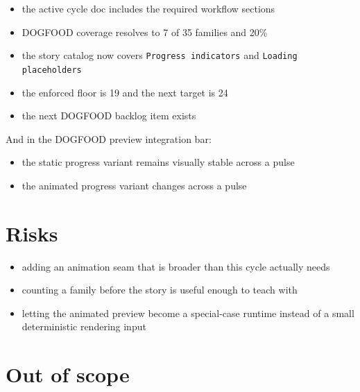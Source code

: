 \begin{itemize}
\tightlist
\item
  the active cycle doc includes the required workflow sections
\item
  DOGFOOD coverage resolves to 7 of 35 families and 20\%
\item
  the story catalog now covers \texttt{P\allowbreak{}r\allowbreak{}o\allowbreak{}g\allowbreak{}r\allowbreak{}e\allowbreak{}s\allowbreak{}s\allowbreak{} \allowbreak{}i\allowbreak{}n\allowbreak{}d\allowbreak{}i\allowbreak{}c\allowbreak{}a\allowbreak{}t\allowbreak{}o\allowbreak{}r\allowbreak{}s} and \texttt{L\allowbreak{}o\allowbreak{}a\allowbreak{}d\allowbreak{}i\allowbreak{}n\allowbreak{}g\allowbreak{} \allowbreak{}p\allowbreak{}l\allowbreak{}a\allowbreak{}c\allowbreak{}e\allowbreak{}h\allowbreak{}o\allowbreak{}l\allowbreak{}d\allowbreak{}e\allowbreak{}r\allowbreak{}s}
\item
  the enforced floor is 19 and the next target is 24
\item
  the next DOGFOOD backlog item exists
\end{itemize}

And in the DOGFOOD preview integration bar:

\begin{itemize}
\tightlist
\item
  the static progress variant remains visually stable across a pulse
\item
  the animated progress variant changes across a pulse
\end{itemize}

\section{Risks}\label{record-067-risks}

\begin{itemize}
\tightlist
\item
  adding an animation seam that is broader than this cycle actually needs
\item
  counting a family before the story is useful enough to teach with
\item
  letting the animated preview become a special-case runtime instead of a small deterministic rendering input
\end{itemize}

\section{Out of scope}\label{record-067-out-of-scope}

